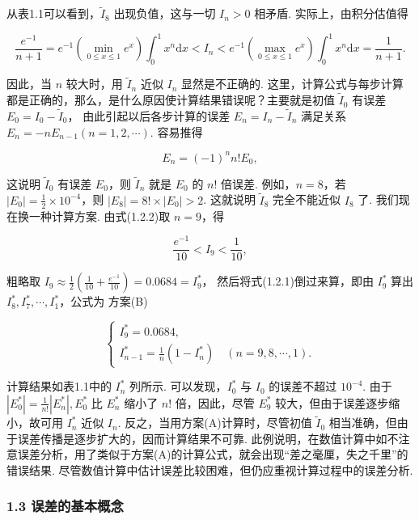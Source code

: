 \documentclass[
  10pt,
  a4paper,
]{article}
\begin{document}
从表1.1可以看到，\(\tilde{I}_8\) 出现负值，这与一切 \(I_n > 0\) 相矛盾.
实际上，由积分估值得

\[
\frac{e^{-1}}{n+1} = e^{-1}\left(\min_{0 \leqslant x \leqslant 1} e^x\right)\int_0^1 x^n \mathrm{d}x < I_n < e^{-1}\left(\max_{0 \leqslant x \leqslant 1} e^x\right)\int_0^1 x^n \mathrm{d}x = \frac{1}{n+1}. \tag{1.2.2}
\]

因此，当 \(n\) 较大时，用 \(\tilde{I}_n\) 近似 \(I_n\) 显然是不正确的.
这里，计算公式与每步计算都是正确的，那么，是什么原因使计算结果错误呢？主要就是初值
\(\tilde{I}_0\) 有误差 \(E_0 = I_0 - \tilde{I}_0\)，
由此引起以后各步计算的误差 \(E_n = I_n - \tilde{I}_n\) 满足关系
\(E_n = -nE_{n-1}(n=1,2,\cdots)\). 容易推得

\[
E_n = (-1)^n n! E_0,
\]

这说明 \(\tilde{I}_0\) 有误差 \(E_0\)，则 \(\tilde{I}_n\) 就是 \(E_0\)
的 \(n!\) 倍误差. 例如，\(n=8\)，若
\(|E_0| = \frac{1}{2} \times 10^{-4}\)，则
\(|E_8| = 8! \times |E_0| > 2\). 这就说明 \(\tilde{I}_8\) 完全不能近似
\(I_8\) 了. 我们现在换一种计算方案. 由式(1.2.2)取 \(n=9\)，得

\[
\frac{e^{-1}}{10} < I_9 < \frac{1}{10},
\]

粗略取
\(I_9 \approx \frac{1}{2}\left(\frac{1}{10} + \frac{e^{-1}}{10}\right) = 0.0684 = I_9^*\)，
然后将式(1.2.1)倒过来算，即由 \(I_9^*\) 算出
\(I_8^*, I_7^*, \cdots, I_1^*\)，公式为 方案(B)

\[
\begin{cases} I_9^* = 0.0684, \\ I_{n-1}^* = \frac{1}{n}(1 - I_n^*) \quad (n = 9, 8, \cdots, 1). \end{cases}
\]

计算结果如表1.1中的 \(I_n^*\) 列所示. 可以发现，\(I_0^*\) 与 \(I_0\)
的误差不超过 \(10^{-4}\). 由于 \(|E_0^*| = \frac{1}{n!}|E_n^*|, E_0^*\)
比 \(E_n^*\) 缩小了 \(n!\) 倍，因此，尽管 \(E_9^*\)
较大，但由于误差逐步缩小，故可用 \(I_n^*\) 近似 \(I_n\).
反之，当用方案(A)计算时，尽管初值 \(\tilde{I}_0\)
相当准确，但由于误差传播是逐步扩大的，因而计算结果不可靠.
此例说明，在数值计算中如不注意误差分析，用了类似于方案(A)的计算公式，就会出现``差之毫厘，失之千里''的错误结果.
尽管数值计算中估计误差比较困难，但仍应重视计算过程中的误差分析.

\subsubsection{1.3
误差的基本概念}\label{ux8befux5deeux7684ux57faux672cux6982ux5ff5}
\end{document}
